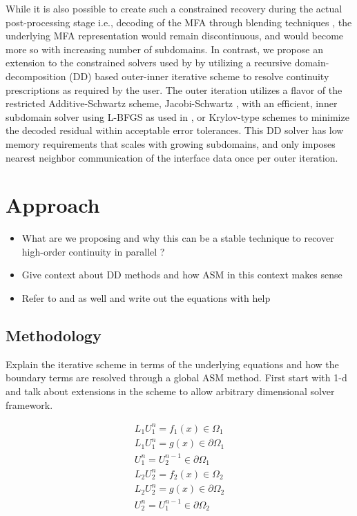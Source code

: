 \documentclass[conference]{IEEEtran}
\begin{document}
While it is also possible to create such a constrained recovery during the actual post-processing stage i.e., decoding of the MFA through blending techniques \cite{grindeanu-blending}, the underlying MFA representation would remain discontinuous, and would become more so with increasing number of subdomains. In contrast, we propose an extension to the constrained solvers used by \cite{zhang-nurbs-continuity, xu-jahn-discrete-adjoint} by utilizing a recursive domain-decomposition (DD) based outer-inner iterative scheme to resolve continuity prescriptions as required by the user. The outer iteration utilizes a flavor of the restricted Additive-Schwartz scheme, Jacobi-Schwartz \cite{smith-ddm}, with an efficient, inner subdomain solver using L-BFGS as used in \cite{zheng-bo-bspline-bfgs}, or Krylov-type schemes to minimize the decoded residual within acceptable error tolerances. This DD solver has low memory requirements that scales with growing subdomains, and only imposes nearest neighbor communication of the interface data once per outer iteration. 


\section{Approach}

\begin{itemize}
	\item What are we proposing and why this can be a stable technique to recover high-order continuity in parallel ?
	\item Give context about DD methods and how ASM in this context makes sense 
	\item Refer to \cite{smith-ddm} and \cite{ddm-rbf-fast} as well and write out the equations with \cite{nurbs-book} help
\end{itemize}

\subsection{Methodology}

Explain the iterative scheme in terms of the underlying equations and how the boundary terms are resolved through a global ASM method. First start with 1-d and talk about extensions in the scheme to allow arbitrary dimensional solver framework.

\begin{eqnarray} \label{asm}
L_1U^{n}_1=f_1(x) \in \Omega_1  \\
L_1U^{n}_1=g(x) \in \partial\Omega_1 \\ 
U^{n}_1 = U^{n-1}_2 \in \partial\Omega_1 \\
L_2U^{n}_2=f_2(x) \in \Omega_2 \\
L_2U^{n}_2=g(x) \in \partial\Omega_2 \\
U^{n}_2 = U^{n-1}_1 \in \partial\Omega_2
\end{eqnarray}
\end{document}
